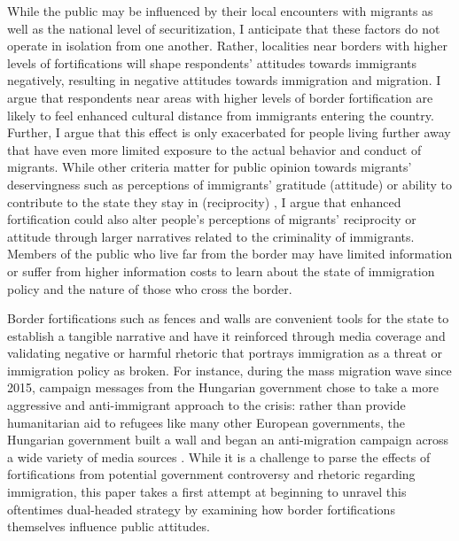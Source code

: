 \documentclass[12pt,]{article}
\begin{document}
While the public may be influenced by their local encounters with
migrants as well as the national level of securitization, I anticipate
that these factors do not operate in isolation from one another. Rather,
localities near borders with higher levels of fortifications will shape
respondents' attitudes towards immigrants negatively, resulting in
negative attitudes towards immigration and migration. I argue that
respondents near areas with higher levels of border fortification are
likely to feel enhanced cultural distance from immigrants entering the
country. Further, I argue that this effect is only exacerbated for
people living further away that have even more limited exposure to the
actual behavior and conduct of migrants. While other criteria matter for
public opinion towards migrants' deservingness such as perceptions of
immigrants' gratitude (attitude) or ability to contribute to the state
they stay in (reciprocity) \citep{deconinck2020a}, I argue that enhanced
fortification could also alter people's perceptions of migrants'
reciprocity or attitude through larger narratives related to the
criminality of immigrants. Members of the public who live far from the
border may have limited information or suffer from higher information
costs to learn about the state of immigration policy and the nature of
those who cross the border.

Border fortifications such as fences and walls are convenient tools for
the state to establish a tangible narrative and have it reinforced
through media coverage and validating negative or harmful rhetoric that
portrays immigration as a threat or immigration policy as broken. For
instance, during the mass migration wave since 2015, campaign messages
from the Hungarian government chose to take a more aggressive and
anti-immigrant approach to the crisis: rather than provide humanitarian
aid to refugees like many other European governments, the Hungarian
government built a wall and began an anti-migration campaign across a
wide variety of media sources \citep{bajomi-lazar2019}. While it is a
challenge to parse the effects of fortifications from potential
government controversy and rhetoric regarding immigration, this paper
takes a first attempt at beginning to unravel this oftentimes
dual-headed strategy by examining how border fortifications themselves
influence public attitudes.
\end{document}
